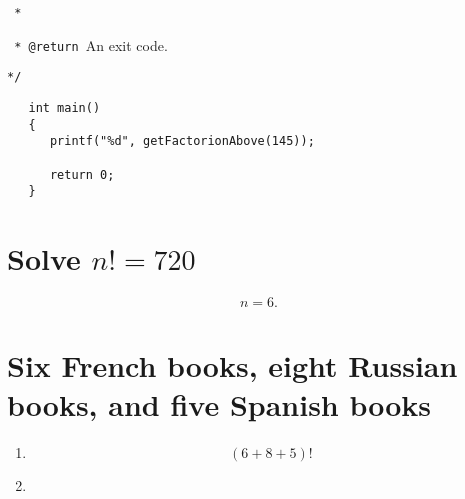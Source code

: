\documentclass[12pt]{article}
\begin{document}
\verb| * |

\verb| * @return |An exit code.

\verb|*/|

\begin{verbatim}
   int main()
   {
      printf("%d", getFactorionAbove(145));
    
      return 0;
   }
\end{verbatim}
\section{Solve $n!=720$}
\[n=6.\]
\section{Six French books, eight Russian books, and five Spanish books}
\begin{enumerate}
\item \[(6+8+5)!\]
\item \[\]
\end{enumerate}
\section{}
\end{document}
